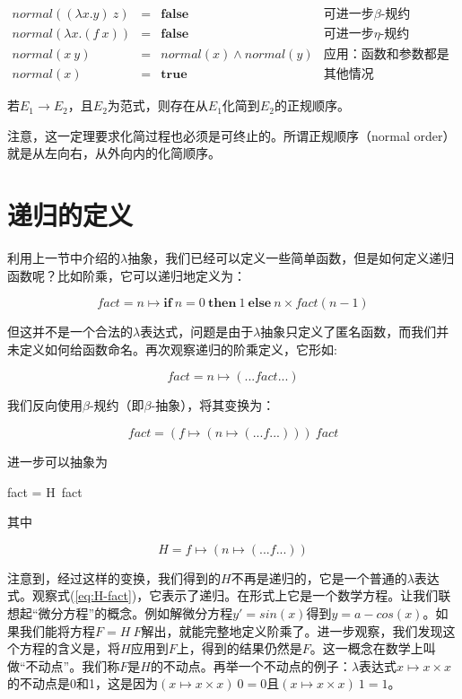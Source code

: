 \documentclass[UTF8]{article}
\begin{document}
\[
\begin{array}{rcll}
normal((\lambda x . y)\ z) & = & \textbf{false} & \text{可进一步$\beta$-规约} \\
normal(\lambda x . (f\ x)) & = & \textbf{false} & \text{可进一步$\eta$-规约} \\
normal(x\ y) & = & normal(x) \land normal(y) & \text{应用：函数和参数都是范式} \\
normal(x) & = & \textbf{true} & \text{其他情况}
\end{array}
\]

\begin{theorem}[丘奇-罗瑟定理二]
若$E_1 \to E_2$，且$E_2$为范式，则存在从$E_1$化简到$E_2$的正规顺序。
\end{theorem}

注意，这一定理要求化简过程也必须是可终止的。所谓正规顺序（normal order）就是从左向右，从外向内的化简顺序。

\section{递归的定义}

利用上一节中介绍的$\lambda$抽象，我们已经可以定义一些简单函数，但是如何定义递归函数呢？比如阶乘，它可以递归地定义为：

\[
fact = n \mapsto \textbf{if}\ n = 0\ \textbf{then}\ 1\ \textbf{else}\ n \times fact (n - 1)
\]

但这并不是一个合法的$\lambda$表达式，问题是由于$\lambda$抽象只定义了匿名函数，而我们并未定义如何给函数命名。再次观察递归的阶乘定义，它形如:

\[
fact = n \mapsto (... fact ...)
\]

我们反向使用$\beta$-规约（即$\beta$-抽象），将其变换为：

\[
fact = (f \mapsto (n \mapsto (... f ...)))\ fact
\]

进一步可以抽象为

\be
fact = H\ fact
\label{eq:H-fact}
\ee

其中

\[
H = f \mapsto (n \mapsto (... f ...))
\]

注意到，经过这样的变换，我们得到的$H$不再是递归的，它是一个普通的$\lambda$表达式。观察式(\ref{eq:H-fact})，它表示了递归。在形式上它是一个数学方程。让我们联想起“微分方程”的概念。例如解微分方程$y' = sin(x)$得到$y = a - cos(x)$。如果我们能将方程$F = H\ F$解出，就能完整地定义阶乘了。进一步观察，我们发现这个方程的含义是，将$H$应用到$F$上，得到的结果仍然是$F$。这一概念在数学上叫做“不动点”。我们称$F$是$H$的不动点。再举一个不动点的例子：$\lambda$表达式$x \mapsto x \times x$的不动点是0和1，这是因为$(x \mapsto x \times x)\ 0 = 0$且$(x \mapsto x \times x)\ 1 = 1$。
\end{document}
